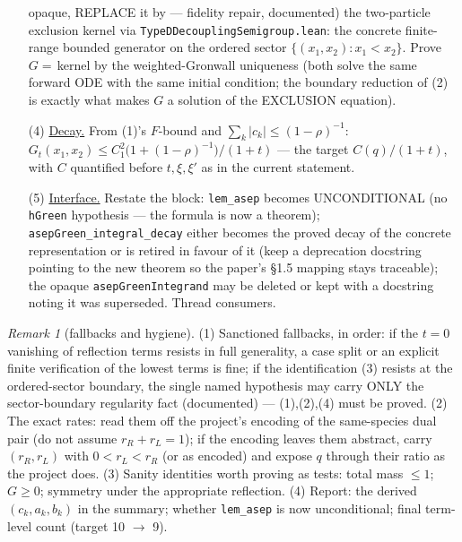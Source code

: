 \documentclass[11pt]{article}
\theoremstyle{plain}
\theoremstyle{remark}
\newtheorem{remark}{Remark}
\begin{document}
\begin{itemize}
opaque, REPLACE it by --- fidelity repair, documented) the two-particle
exclusion kernel via \texttt{TypeDDecouplingSemigroup.lean}: the concrete
finite-range bounded generator on the ordered sector
$\{(x_1,x_2):x_1<x_2\}$. Prove $G=\,$kernel by the weighted-Gronwall
uniqueness (both solve the same forward ODE with the same initial condition;
the boundary reduction of (2) is exactly what makes $G$ a solution of the
EXCLUSION equation).
\item[(4)] \underline{Decay.} From (1)'s $F$-bound and $\sum_k|c_k|\le
(1-\rho)^{-1}$:
$G_t(x_1,x_2)\le C_1^2\big(1+(1-\rho)^{-1}\big)/(1+t)$ --- the target
$C(q)/(1+t)$, with $C$ quantified before $t,\xi,\xi'$ as in the current
statement.
\item[(5)] \underline{Interface.} Restate the block: \texttt{lem\_asep}
becomes UNCONDITIONAL (no \texttt{hGreen} hypothesis --- the formula is now a
theorem); \texttt{asepGreen\_integral\_decay} either becomes the proved decay
of the concrete representation or is retired in favour of it (keep a
deprecation docstring pointing to the new theorem so the paper's \S1.5
mapping stays traceable); the opaque \texttt{asepGreenIntegrand} may be
deleted or kept with a docstring noting it was superseded. Thread consumers.
\end{itemize}

\begin{remark}[fallbacks and hygiene]
(1) Sanctioned fallbacks, in order: if the $t=0$ vanishing of reflection terms
resists in full generality, a case split or an explicit finite verification of
the lowest terms is fine; if the identification (3) resists at the
ordered-sector boundary, the single named hypothesis may carry ONLY the
sector-boundary regularity fact (documented) --- (1),(2),(4) must be proved.
(2) The exact rates: read them off the project's encoding of the same-species
dual pair (do not assume $r_R+r_L=1$); if the encoding leaves them abstract,
carry $(r_R,r_L)$ with $0<r_L<r_R$ (or as encoded) and expose $q$ through
their ratio as the project does.
(3) Sanity identities worth proving as tests: total mass $\le1$;
$G\ge0$; symmetry under the appropriate reflection.
(4) Report: the derived $(c_k,a_k,b_k)$ in the summary; whether
\texttt{lem\_asep} is now unconditional; final term-level count
(target 10 $\to$ 9).
\end{remark}
\end{document}
